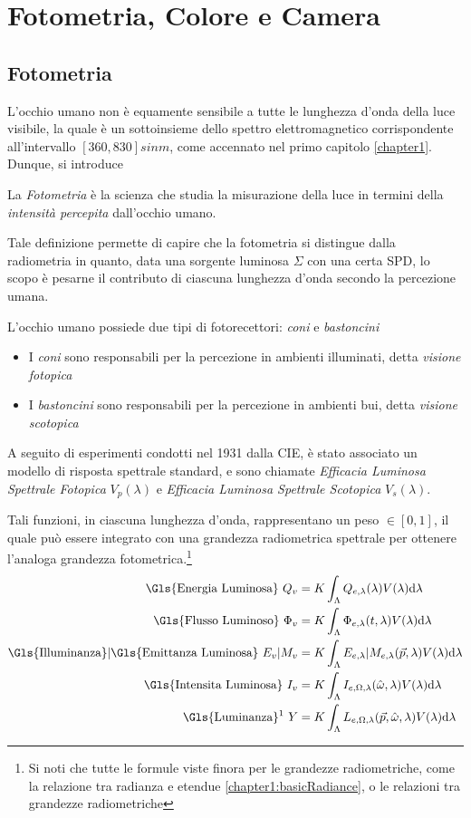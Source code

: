 \label{chapter2}
\chapter{Fotometria, Colore e Camera}
\section{Fotometria}
L'occhio umano non \`e equamente sensibile a tutte le lunghezza d'onda della luce visibile, la quale \`e un sottoinsieme dello spettro elettromagnetico
corrispondente all'intervallo $[360,830] si{nm}$, come accennato nel primo capitolo \ref{chapter1}. Dunque, si introduce
\begin{definitionS}
	La \textit{Fotometria} \`e la scienza che studia la misurazione della luce in termini della \textit{intensit\`a percepita} dall'occhio umano.
\end{definitionS}
Tale definizione permette di capire che la fotometria si distingue dalla radiometria in quanto, data una sorgente luminosa $\Sigma$ con una certa
SPD, lo scopo \`e pesarne il contributo di ciascuna lunghezza d'onda secondo la percezione umana.\par
L'occhio umano possiede due tipi di fotorecettori: \textit{coni} e \textit{bastoncini}
\begin{itemize}[topsep=0pt, noitemsep]
	\item[] I \textit{coni} sono responsabili per la percezione in ambienti illuminati, detta \textit{visione fotopica}
	\item[] I \textit{bastoncini} sono responsabili per la percezione in ambienti bui, detta \textit{visione scotopica}
\end{itemize}
A seguito di esperimenti condotti nel 1931 dalla CIE, \`e stato associato un modello di risposta spettrale standard, e sono chiamate 
\textit{Efficacia Luminosa Spettrale Fotopica} $V_p(\lambda)$ e \textit{Efficacia Luminosa Spettrale Scotopica} $V_s(\lambda)$.\par
Tali funzioni, in ciascuna lunghezza d'onda, rappresentano un peso $\in[0,1]$, il quale pu\`o essere integrato con una grandezza radiometrica spettrale
per ottenere l'analoga grandezza fotometrica.\footnote{Si noti che tutte le formule viste finora per le grandezze radiometriche, come la relazione 
tra radianza e etendue \ref{chapter1:basicRadiance}, o le relazioni tra grandezze radiometriche}
\begin{align} \label{chapter2:photometricQuantities}
	\text{\Gls{Energia Luminosa} } Q_v &= K\int_\Lambda Q_{e,\lambda}(\lambda)V(\lambda)\mathrm{d}\lambda\\
	\text{\Gls{Flusso Luminoso} } \Phi_v &= K\int_\Lambda\Phi_{e,\lambda}(t, \lambda)V(\lambda)\mathrm{d}\lambda\\
	\text{\Gls{Illuminanza}|\Gls{Emittanza Luminosa} } E_v|M_v &= K\int_\Lambda E_{e,\lambda}|M_{e,\lambda}(\vec{p},\lambda)V(\lambda)\mathrm{d}\lambda\\
	\text{\Gls{Intensita Luminosa} } I_v &= K\int_\Lambda I_{e,\Omega,\lambda}(\hat{\omega},\lambda)V(\lambda)\mathrm{d}\lambda\\
	\text{\Gls{Luminanza}\footnotemark{} } Y &= K\int_\Lambda L_{e,\Omega,\lambda}(\vec{p},\hat{\omega},\lambda)V(\lambda)\mathrm{d}\lambda
\end{align}
